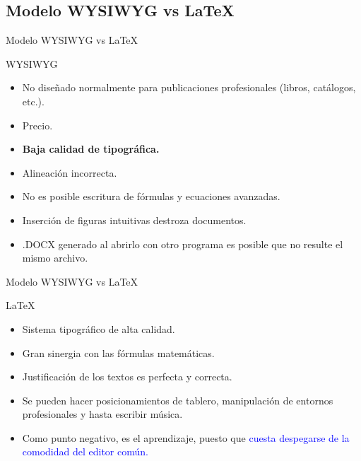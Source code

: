 \documentclass{beamer}
\begin{document}
\subsection{Modelo WYSIWYG vs \LaTeX{}}
\begin{frame}{Modelo WYSIWYG vs \LaTeX{}}
   \begin{alertblock}{WYSIWYG}
   \begin{itemize}
       \item No diseñado normalmente para publicaciones profesionales (libros, catálogos, etc.).
        \item Precio. \\ %
        \item \textbf{Baja calidad de tipográfica.}\\
        \item Alineación incorrecta.\\
        \item No es posible escritura de fórmulas y ecuaciones avanzadas.\\
        \item Inserción de figuras intuitivas destroza documentos.\\
        \item .DOCX generado al abrirlo con otro programa es posible que no resulte el mismo archivo.
   \end{itemize}
\end{alertblock}
\end{frame}

\begin{frame}{Modelo WYSIWYG vs \LaTeX{}}
\begin{exampleblock}{\LaTeX{}} %
\begin{itemize}
    \item Sistema tipográfico de alta calidad. %
    \item Gran sinergia con las fórmulas matemáticas.
    \item Justificación de los textos es perfecta y correcta.
    \item Se pueden hacer posicionamientos de tablero, manipulación de entornos profesionales y hasta escribir música.
    \item Como punto negativo, es el aprendizaje, puesto que \textcolor{blue}{cuesta despegarse de la comodidad del editor común.}
\end{itemize}
\end{exampleblock}
\end{frame}
\end{document}
